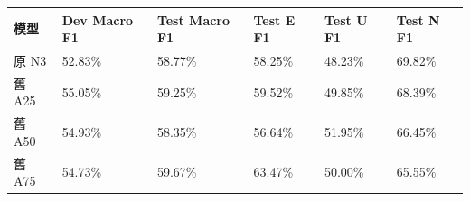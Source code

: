 \begin{tabular}{llllll}
\toprule
模型 & Dev Macro F1 & Test Macro F1 & Test E F1 & Test U F1 & Test N F1\\
\midrule
原 N3 & 52.83\% & 58.77\% & 58.25\% & 48.23\% & 69.82\%\\
舊 A25 & 55.05\% & 59.25\% & 59.52\% & 49.85\% & 68.39\%\\
舊 A50 & 54.93\% & 58.35\% & 56.64\% & 51.95\% & 66.45\%\\
舊 A75 & 54.73\% & 59.67\% & 63.47\% & 50.00\% & 65.55\%\\
\bottomrule
\end{tabular}
